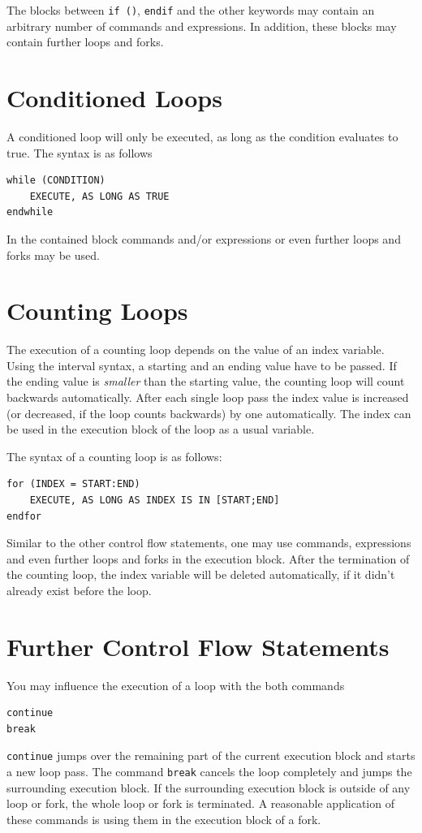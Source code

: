 \documentclass[DIV=14,headsepline,footsepline]{scrbook}
\begin{document}
				The blocks between \lstinline+if ()+, \lstinline+endif+ and the other keywords may contain an arbitrary number of commands and expressions. In addition, these blocks may contain further loops and forks.
				
			\section{Conditioned Loops}
				A conditioned loop will only be executed, as long as the condition evaluates to true. The syntax is as follows
				\begin{lstlisting}
while (CONDITION)
	EXECUTE, AS LONG AS TRUE
endwhile
				\end{lstlisting}
				In the contained block commands and/or expressions or even further loops and forks may be used.
				
			\section{Counting Loops}
				The execution of a counting loop depends on the value of an index variable. Using the interval syntax, a starting and an ending value have to be passed. If the ending value is \emph{smaller} than the starting value, the counting loop will count backwards automatically. After each single loop pass the index value is increased (or decreased, if the loop counts backwards) by one automatically. The index can be used in the execution block of the loop as a usual variable.
				
				The syntax of a counting loop is as follows:
				\begin{lstlisting}
for (INDEX = START:END)
	EXECUTE, AS LONG AS INDEX IS IN [START;END]
endfor
				\end{lstlisting}
				Similar to the other control flow statements, one may use commands, expressions and even further loops and forks in the execution block. After the termination of the counting loop, the index variable will be deleted automatically, if it didn't already exist before the loop.
				
			\section{Further Control Flow Statements}
				You may influence the execution of a loop with the both commands
				\begin{lstlisting}
continue
break
				\end{lstlisting}
				\lstinline+continue+ jumps over the remaining part of the current execution block and starts a new loop pass. The command \lstinline+break+ cancels the loop completely and jumps the surrounding execution block. If the surrounding execution block is outside of any loop or fork, the whole loop or fork is terminated. A reasonable application of these commands is using them in the execution block of a fork.
				
\end{document}
